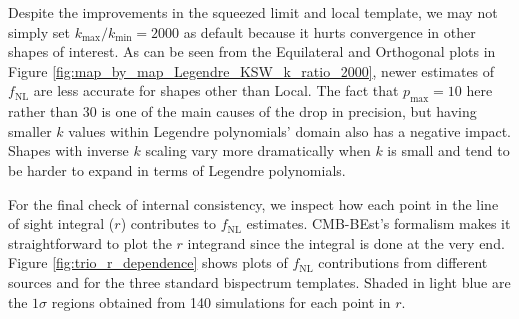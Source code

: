 Despite the improvements in the squeezed limit and local template, we may not simply set $k_\text{max} / k_\text{min} = 2000$ as default because it hurts convergence in other shapes of interest. As can be seen from the Equilateral and Orthogonal plots in Figure \ref{fig:map_by_map_Legendre_KSW_k_ratio_2000}, newer estimates of $f_\text{NL}$ are less accurate for shapes other than Local. The fact that $p_\text{max}=10$ here rather than $30$ is one of the main causes of the drop in precision, but having smaller $k$ values within Legendre polynomials' domain also has a negative impact. Shapes with inverse $k$ scaling vary more dramatically when $k$ is small and tend to be harder to expand in terms of Legendre polynomials.

For the final check of internal consistency, we inspect how each point in the line of sight integral ($r$) contributes to $f_\text{NL}$ estimates. CMB-BEst's formalism makes it straightforward to plot the $r$ integrand since the integral is done at the very end. Figure \ref{fig:trio_r_dependence} shows plots of $f_\text{NL}$ contributions from different sources and for the three standard bispectrum templates. Shaded in light blue are the $1\sigma$ regions obtained from 140 simulations for each point in $r$.

